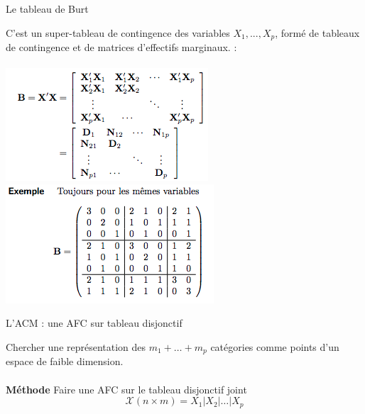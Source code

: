 \documentclass[11pt]{beamer}
\begin{document}

\begin{frame}{Le tableau de Burt}

 C'est un super-tableau de contingence des variables
$X_1, . . . , X_p$, formé de tableaux de contingence et de
matrices d'effectifs marginaux. : \\~\\

\centering
\includegraphics[scale=0.5]{Disj4} 
\includegraphics[scale=0.5]{Disj5} 

\end{frame}


\begin{frame}{L'ACM : une AFC sur tableau disjonctif}

Chercher une représentation des $m_1+\ldots+m_p$
catégories comme points d'un espace de faible dimension.\\ ~\\

\textbf{Méthode }  Faire une AFC sur le tableau disjonctif joint   
$$ \mathcal{X}(n \times m)= {X}_1\vert  {X}_2\vert  \ldots  \vert{X}_p $$

 

 

\end{frame}

\end{document}
